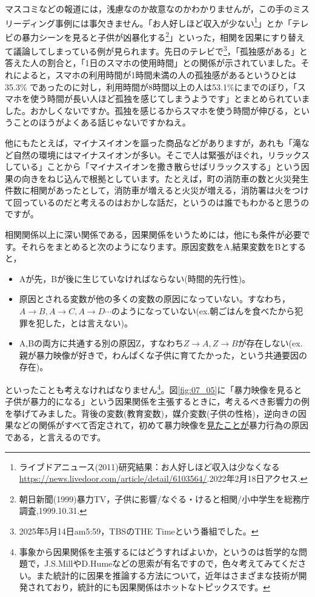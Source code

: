 \documentclass{ltjbook}
\begin{document}
マスコミなどの報道には，浅慮なのか故意なのかわかりませんが，この手のミスリーディング事例には事欠きません。「お人好しほど収入が少ない\footnote{ライブドアニュース(2011)研究結果：お人好しほど収入は少なくなる\url{https://news.livedoor.com/article/detail/6103564/}.2022年2月18日アクセス.}」とか「テレビの暴力シーンを見ると子供が凶暴化する\footnote{朝日新聞(1999)暴力TV，子供に影響/なぐる・けると相関/小中学生を総務庁調査,1999.10.31.}」といった，相関を因果にすり替えて議論してしまっている例が見られます。先日のテレビで\footnote{2025年5月14日am5:59，TBSのTHE Timeという番組でした。}，「孤独感がある」と答えた人の割合と，「1日のスマホの使用時間」との関係が示されていました。それによると，スマホの利用時間が1時間未満の人の孤独感があるというひとは35.3\% であったのに対し，利用時間が8時間以上の人は53.1\%にまでのぼり，「スマホを使う時間が長い人ほど孤独を感じてしまうようです」とまとめられていました。おかしくないですか。孤独を感じるからスマホを使う時間が伸びる，ということのほうがよくある話じゃないですかねえ。

他にもたとえば，マイナスイオンを謳った商品などがありますが，あれも「滝など自然の環境にはマイナスイオンが多い。そこで人は緊張がほぐれ，リラックスしている」ことから「マイナスイオンを撒き散らせばリラックスする」という因果の向きをねじ込んで根拠としています。たとえば，町の消防車の数と火災発生件数に相関があったとして，消防車が増えると火災が増える，消防署は火をつけて回っているのだと考えるのはおかしな話だ，というのは誰でもわかると思うのですが。

相関関係以上に深い関係である，因果関係をいうためには，他にも条件が必要です。それらをまとめると次のようになります。原因変数をA,結果変数をBとすると，
\begin{itemize}
	\item Aが先，Bが後に生じていなければならない(時間的先行性)。
	\item 原因とされる変数が他の多くの変数の原因になっていない。すなわち，$A \to B, A \to C, A \to D \cdots$のようになっていない(ex.朝ごはんを食べたから犯罪を犯した，とは言えない)。
	\item A,Bの両方に共通する別の原因Z，すなわち$Z \to A, Z \to B$が存在しない(ex.親が暴力映像が好きで，わんぱくな子供に育てたかった，という共通要因の存在)。
\end{itemize}
といったことも考えなければなりません\footnote{事象から因果関係を主張するにはどうすればよいか，というのは哲学的な問題で，J.S.MillやD.Humeなどの思索が有名ですので，色々考えてみてください。また統計的に因果を推論する方法について，近年はさまざまな技術が開発されており，統計的にも因果関係はホットなトピックスです。}。図\ref{fig:07_05}に「暴力映像を見ると子供が暴力的になる」という因果関係を主張するときに，考えるべき影響力の例を挙げてみました。背後の変数(教育変数)，媒介変数(子供の性格)，逆向きの因果などの関係がすべて否定されて，初めて暴力映像を\underline{見たことが}暴力行為の原因である，と言えるのです。
\end{document}
